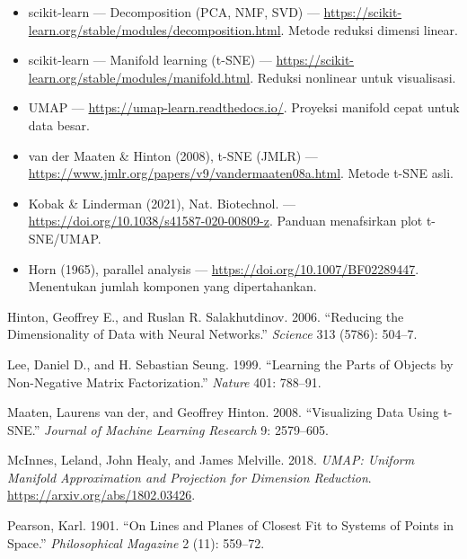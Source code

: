 \begin{bacaan}

\begin{itemize}
\tightlist
\item
  scikit-learn --- Decomposition (PCA, NMF, SVD) --- \url{https://scikit-learn.org/stable/modules/decomposition.html}. Metode reduksi dimensi linear.
\item
  scikit-learn --- Manifold learning (t-SNE) --- \url{https://scikit-learn.org/stable/modules/manifold.html}. Reduksi nonlinear untuk visualisasi.
\item
  UMAP --- \url{https://umap-learn.readthedocs.io/}. Proyeksi manifold cepat untuk data besar.
\item
  van der Maaten \& Hinton (2008), t-SNE (JMLR) --- \url{https://www.jmlr.org/papers/v9/vandermaaten08a.html}. Metode t-SNE asli.
\item
  Kobak \& Linderman (2021), Nat. Biotechnol. --- \url{https://doi.org/10.1038/s41587-020-00809-z}. Panduan menafsirkan plot t-SNE/UMAP.
\item
  Horn (1965), parallel analysis --- \url{https://doi.org/10.1007/BF02289447}. Menentukan jumlah komponen yang dipertahankan.
\end{itemize}

\end{bacaan}

\rujukanheading

\protect{}\label{refs}
\begin{CSLReferences}{1}{1}
Hinton, Geoffrey E., and Ruslan R. Salakhutdinov. 2006. {``Reducing the Dimensionality of Data with Neural Networks.''} \emph{Science} 313 (5786): 504--7.

Lee, Daniel D., and H. Sebastian Seung. 1999. {``Learning the Parts of Objects by Non-Negative Matrix Factorization.''} \emph{Nature} 401: 788--91.

Maaten, Laurens van der, and Geoffrey Hinton. 2008. {``Visualizing Data Using t-{SNE}.''} \emph{Journal of Machine Learning Research} 9: 2579--605.

McInnes, Leland, John Healy, and James Melville. 2018. \emph{{UMAP}: Uniform Manifold Approximation and Projection for Dimension Reduction}. \url{https://arxiv.org/abs/1802.03426}.

Pearson, Karl. 1901. {``On Lines and Planes of Closest Fit to Systems of Points in Space.''} \emph{Philosophical Magazine} 2 (11): 559--72.

\end{CSLReferences}
